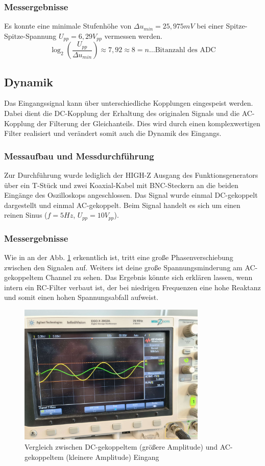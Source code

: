 \documentclass[a4paper]{article}
\begin{document}
\subsubsection{Messergebnisse}
Es konnte eine minimale Stufenhöhe von $\Delta u_{min}=25,975 \unit{mV}$ bei einer
Spitze-Spitze-Spannung $U_{pp}=6,29\unit{V_{pp}}$ vermessen werden.
\[ \log_{2}(\frac{U_{pp}}{\Delta u_{min}})\approx 7,92 \approx 8 = n\text{\ldots Bitanzahl des ADC} \]


\subsection{Dynamik}
Das Eingangssignal kann über unterschiedliche Kopplungen eingespeist werden.
Dabei dient die DC-Kopplung der Erhaltung des originalen Signals und die AC-Kopplung
der Filterung der Gleichanteils. Dies wird durch einen komplexwertigen Filter
realisiert und verändert somit auch die Dynamik des Eingangs.

\subsubsection{Messaufbau und Messdurchführung}
Zur Durchführung wurde lediglich der HIGH-Z Ausgang des Funktionsgenerators über
ein T-Stück und zwei Koaxial-Kabel mit BNC-Steckern an die beiden Eingänge des
Oszilloskops angeschlossen. Das Signal wurde einmal DC-gekoppelt dargestellt und
einmal AC-gekoppelt. Beim Signal handelt es sich um einen reinen
Sinus ($f=5\unit{Hz}$,  $U_{pp}=10\unit{V_{pp}}$).

\subsubsection{Messergebnisse}
Wie in an der Abb. \ref{fig:images-Oszi-Dynamik-jpg} erkenntlich ist, tritt eine
große Phasenverschiebung zwischen den Signalen auf. Weiters ist deine große
Spannungsminderung am AC-gekoppeltem Channel zu sehen. Das Ergebnis könnte sich
erklären lassen, wenn intern ein RC-Filter verbaut ist, der bei niedrigen
Frequenzen eine hohe Reaktanz und somit einen hohen Spannungsabfall aufweist.

\begin{figure}[h]
    \centering
    \includegraphics[width=0.8\textwidth]{images/Oszi - Dynamik.jpg}
    \caption{Vergleich zwischen DC-gekoppeltem (größere Amplitude) und 
    AC-gekoppeltem (kleinere Amplitude) Eingang}
    \label{fig:images-Oszi-Dynamik-jpg}
\end{figure}
\end{document}
